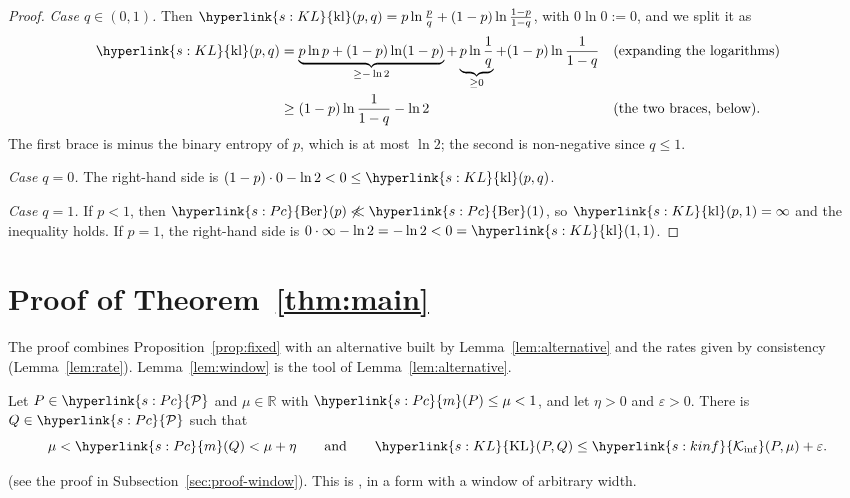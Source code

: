 \documentclass[11pt]{article}
\newcommand{\sy}[2]{\hyperlink{#1}{#2}}
\newcommand{\R}{\mathbb{R}}
\newcommand{\Pc}{\sy{s:Pc}{\mathcal{P}}}
\newcommand{\m}{\sy{s:Pc}{m}}
\newcommand{\Ber}{\sy{s:Pc}{\mathrm{Ber}}}
\newcommand{\KL}{\sy{s:KL}{\mathrm{KL}}}
\newcommand{\kl}{\sy{s:KL}{\mathrm{kl}}}
\newcommand{\Kinf}{\sy{s:kinf}{\mathcal{K}_{\inf}}}
\begin{document}
\begin{proof}
\emph{Case $q\in(0,1)$.} Then $\kl(p,q)=p\ln\frac pq+(1-p)\ln\frac{1-p}{1-q}$, with $0\ln0:=0$,
and we split it as
\begin{align*}
\kl(p,q)&=\underbrace{p\ln p+(1-p)\ln(1-p)}_{\ge-\ln2}+\underbrace{p\ln\frac1q}_{\ge0}
+(1-p)\ln\frac1{1-q} &&\text{(expanding the logarithms)}\\
&\ge(1-p)\ln\frac1{1-q}-\ln2 &&\text{(the two braces, below)}.
\end{align*}
The first brace is minus the binary entropy of $p$, which is at most $\ln2$; the second is
non-negative since $q\le1$.

\emph{Case $q=0$.} The right-hand side is $(1-p)\cdot0-\ln2<0\le\kl(p,q)$.

\emph{Case $q=1$.} If $p<1$, then $\Ber(p)\not\ll\Ber(1)$, so $\kl(p,1)=\infty$ and the inequality
holds. If $p=1$, the right-hand side is $0\cdot\infty-\ln2=-\ln2<0=\kl(1,1)$.
\end{proof}

\section{Proof of Theorem~\ref{thm:main}}\label{sec:proof-main}

The proof combines Proposition~\ref{prop:fixed} with an alternative built by
Lemma~\ref{lem:alternative} and the rates given by consistency (Lemma~\ref{lem:rate}).
Lemma~\ref{lem:window} is the tool of Lemma~\ref{lem:alternative}.

\begin{lemma}\label{lem:window}
Let $P\in\Pc$ and $\mu\in\R$ with $\m(P)\le\mu<1$, and let $\eta>0$ and $\varepsilon>0$. There is
$Q\in\Pc$ such that
\begin{equation*}
\mu<\m(Q)<\mu+\eta\qquad\text{and}\qquad\KL(P,Q)\le\Kinf(P,\mu)+\varepsilon .
\end{equation*}
\end{lemma}
(see the proof in Subsection~\ref{sec:proof-window}). This is \citet[Lemma~23]{PMRM26}, in a form
with a window of arbitrary width.
\end{document}
